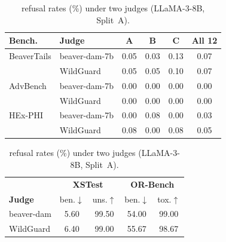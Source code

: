 \begin{table}[htbp]
\centering
\begin{minipage}[t]{0.55\linewidth}
\centering
\caption{Harmful rate (\%) of \method{} on LLaMA-3-8B under two judges.}
\label{tab:judges}
\scriptsize
\setlength{\tabcolsep}{3pt}
\begin{tabular}{@{}llcccc@{}}
\toprule
\textbf{Bench.} & \textbf{Judge} & \textbf{A} & \textbf{B} & \textbf{C} & \textbf{All 12} \\
\midrule
BeaverTails & beaver-dam-7b & 0.05 & 0.03 & 0.13 & 0.07 \\
            & WildGuard     & 0.05 & 0.05 & 0.10 & 0.07 \\
AdvBench    & beaver-dam-7b & 0.00 & 0.00 & 0.00 & 0.00 \\
            & WildGuard     & 0.00 & 0.00 & 0.00 & 0.00 \\
HEx-PHI     & beaver-dam-7b & 0.00 & 0.08 & 0.00 & 0.03 \\
            & WildGuard     & 0.08 & 0.00 & 0.08 & 0.05 \\
\bottomrule
\end{tabular}
\end{minipage}\hfill
\begin{minipage}[t]{0.42\linewidth}
\centering
\caption{\method{} refusal rates (\%) under two judges (LLaMA-3-8B, Split~A).}
\label{tab:judges_or}
\scriptsize
\setlength{\tabcolsep}{2.5pt}
\begin{tabular}{@{}lcccc@{}}
\toprule
 & \multicolumn{2}{c}{\textbf{XSTest}} & \multicolumn{2}{c}{\textbf{OR-Bench}} \\
\textbf{Judge} & ben.$\downarrow$ & uns.$\uparrow$ & ben.$\downarrow$ & tox.$\uparrow$ \\
\midrule
beaver-dam & 5.60 & 99.50 & 54.00 & 99.00 \\
WildGuard  & 6.40 & 99.00 & 55.67 & 98.67 \\
\bottomrule
\end{tabular}
\end{minipage}
\end{table}

